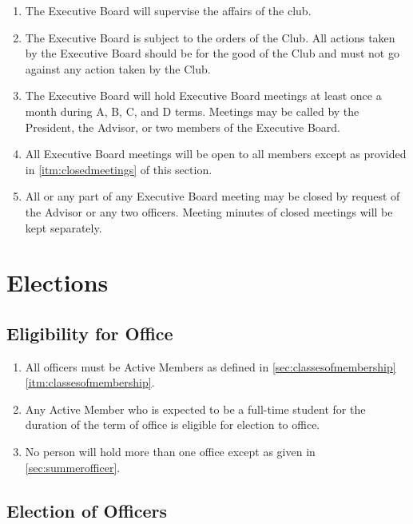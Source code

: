 \documentclass[12pt,letterpaper,oneside]{book}
\begin{document}
\begin{enumerate}

\item The Executive Board will supervise the affairs of the club.
\item The Executive Board is subject to the orders of the Club. All actions taken by the Executive Board should be for the good of the Club and must not go against any action taken by the Club.
\item The Executive Board will hold Executive Board meetings at least once a month during A, B, C, and D terms. Meetings may be called by the President, the Advisor, or two members of the Executive Board.
\item All Executive Board meetings will be open to all members except as provided in \cref{itm:closedmeetings} of this section.
\item \label{itm:closedmeetings} All or any part of any Executive Board meeting may be closed by request of the Advisor or any two officers. Meeting minutes of closed meetings will be kept separately.

\end{enumerate}

\chapter{Elections}

\section{Eligibility for Office} \label{sec:eligibilityforoffice}

\begin{enumerate}

\item All officers must be Active Members as defined in \cref{sec:classesofmembership} \cref{itm:classesofmembership}.
\item Any Active Member who is expected to be a full-time student for the duration of the term of office is eligible for election to office.
\item No person will hold more than one office except as given in \cref{sec:summerofficer}.

\end{enumerate}

\section{Election of Officers} \label{sec:electionprocedures}
\end{document}
